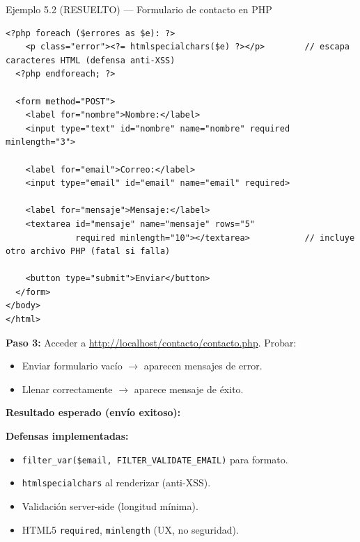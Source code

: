\documentclass[11pt,a4paper,openany]{book}
\begin{document}
\begin{cajaejemplo}{Ejemplo 5.2 (RESUELTO) --- Formulario de contacto en PHP}
\begin{lstlisting}[style=php,caption={contacto.php},label=lst:5.3]
  <?php foreach ($errores as $e): ?>
    <p class="error"><?= htmlspecialchars($e) ?></p>        // escapa caracteres HTML (defensa anti-XSS)
  <?php endforeach; ?>

  <form method="POST">
    <label for="nombre">Nombre:</label>
    <input type="text" id="nombre" name="nombre" required minlength="3">

    <label for="email">Correo:</label>
    <input type="email" id="email" name="email" required>

    <label for="mensaje">Mensaje:</label>
    <textarea id="mensaje" name="mensaje" rows="5"
              required minlength="10"></textarea>           // incluye otro archivo PHP (fatal si falla)

    <button type="submit">Enviar</button>
  </form>
</body>
</html>
\end{lstlisting}

\textbf{Paso 3:} Acceder a
\url{http://localhost/contacto/contacto.php}. Probar:
\begin{itemize}
\item Enviar formulario vacío $\to$ aparecen mensajes de error.
\item Llenar correctamente $\to$ aparece mensaje de éxito.
\end{itemize}

\textbf{Resultado esperado (envío exitoso):}


\textbf{Defensas implementadas:}
\begin{itemize}
\item \texttt{filter\_var(\$email, FILTER\_VALIDATE\_EMAIL)} para
formato.
\item \texttt{htmlspecialchars} al renderizar (anti-XSS).
\item Validación server-side (longitud mínima).
\item HTML5 \texttt{required}, \texttt{minlength} (UX, no seguridad).
\end{itemize}
\end{cajaejemplo}
\end{document}
